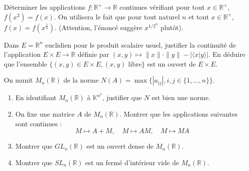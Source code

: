 \begin{exercice}
Déterminer les applications $f: \mathbb{R}^{+} \rightarrow \mathbb{R}$ continues vérifiant pour tout $x \in \mathbb{R}^{+}$, $f(x^{2})=f(x)$.
On utilisera le fait que pour tout naturel $n$ et tout $x \in \mathbb{R}^{+}$, $f(x) = f(x^{\frac{1}{n}})$. (Attention, l'énoncé suggère $x^{1/2^n}$ plutôt).
\end{exercice}

\begin{exercice}
Dans $E=\mathbb{R}^{n}$ euclidien pour le produit scalaire usuel, justifier la continuité de l'application $E \times E \rightarrow \mathbb{R}$ définie par $(x,y) \mapsto \|x\| \cdot \|y\| - |\langle x | y \rangle|$.
En déduire que l'ensemble $\{(x,y) \in E \times E, (x,y) \text{ libre}\}$ est un ouvert de $E \times E$.
\end{exercice}

\begin{exercice}
On munit $M_{n}(\mathbb{R})$ de la norme $N(A) = \max \{|a_{ij}|, i,j \in \{1,\dots,n\}\}$.
\begin{enumerate}
    \item En identifiant $M_{n}(\mathbb{R})$ à $\mathbb{K}^{n^{2}}$, justifier que $N$ est bien une norme.
    \item On fixe une matrice $A$ de $M_{n}(\mathbb{R})$. Montrer que les applications suivantes sont continues :
    $$ M \mapsto A+M, \quad M \mapsto AM, \quad M \mapsto MA $$
    \item Montrer que $GL_{n}(\mathbb{R})$ est un ouvert dense de $M_{n}(\mathbb{R})$.
    \item Montrer que $SL_{n}(\mathbb{R})$ est un fermé d'intérieur vide de $M_{n}(\mathbb{R})$.
\end{enumerate}
\end{exercice}


